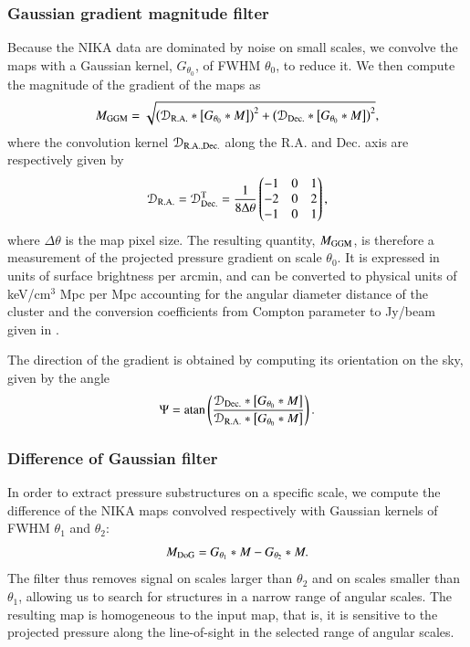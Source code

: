 \documentclass[traditabstract]{aa}
\begin{document}
\subsubsection{Gaussian gradient magnitude filter}
Because the NIKA data are dominated by noise on small scales, we convolve the maps with a Gaussian kernel, $G_{\theta_0}$, of FWHM $\theta_0$, to reduce it. We then compute the magnitude of the gradient of the maps as 
\begin{equation}
        M_{\rm GGM} = \sqrt{\left(\mathcal{D}_{\rm R.A.} \ast \left[G_{\theta_0} \ast M\right]\right)^2 + \left(\mathcal{D}_{\rm Dec.} \ast \left[G_{\theta_0} \ast M\right]\right)^2},
        \label{eq:GGM_filter}
\end{equation}
where the convolution kernel $\mathcal{D}_{\rm R.A., Dec.}$ along the R.A. and Dec. axis are respectively given by
\begin{equation}
        \mathcal{D}_{\rm R.A.}= \mathcal{D}_{\rm Dec.}^{\rm T} = \frac{1}{8 \Delta \theta}
        \begin{pmatrix}
        -1 & 0 & 1\\
        -2 & 0 & 2\\
        -1 & 0 & 1
        \end{pmatrix},
        \label{eq:GGM_kernel}
\end{equation}
where $\Delta \theta$ is the map pixel size. The resulting quantity, $M_{\rm GGM}$, is therefore a measurement of the projected pressure gradient on scale $\theta_0$. It is expressed in units of surface brightness per arcmin, and can be converted to physical units of keV/cm$^3$ Mpc per Mpc accounting for the angular diameter distance of the cluster and the conversion coefficients from Compton parameter to Jy/beam given in \cite{Adam2016b}.

The direction of the gradient is obtained by computing its orientation on the sky, given by the angle
\begin{equation}
        \Psi = {\rm atan} \left( \frac{\mathcal{D}_{\rm Dec.} \ast \left[G_{\theta_0} \ast M\right]}{\mathcal{D}_{\rm R.A.} \ast \left[G_{\theta_0} \ast M\right]} \right).
        \label{eq:GGM_angle}
\end{equation}

\subsubsection{Difference of Gaussian filter}
In order to extract pressure substructures on a specific scale, we compute the difference of the NIKA maps convolved respectively with Gaussian kernels of FWHM $\theta_1$ and $\theta_2$:
\begin{equation}
        M_{\rm DoG} = G_{\theta_1} \ast M - G_{\theta_2} \ast M.
        \label{eq:DoG_filter}
\end{equation}
The filter thus removes signal on scales larger than $\theta_2$ and on scales smaller than $\theta_1$, allowing us to search for structures in a narrow range of angular scales. The resulting map is homogeneous to the input map, that is, it is sensitive to the projected pressure along the line-of-sight in the selected range of angular scales.
\end{document}
